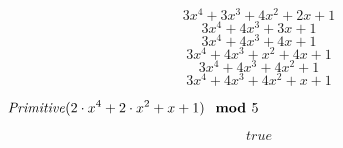 \documentclass{article}
\begin{document}
\vspace{-\bigskipamount}
\begin{dmath*}
3 x^{4}+3 x^{3}+4 x^{2}+2 x +1
\end{dmath*}
\vspace{-\bigskipamount}
\begin{dmath*}
3 x^{4}+4 x^{3}+3 x +1
\end{dmath*}
\vspace{-\bigskipamount}
\begin{dmath*}
3 x^{4}+4 x^{3}+4 x +1
\end{dmath*}
\vspace{-\bigskipamount}
\begin{dmath*}
3 x^{4}+4 x^{3}+x^{2}+4 x +1
\end{dmath*}
\vspace{-\bigskipamount}
\begin{dmath*}
3 x^{4}+4 x^{3}+4 x^{2}+1
\end{dmath*}
\vspace{-\bigskipamount}
\begin{dmath}\label{(10)}
3 x^{4}+4 x^{3}+4 x^{2}+x +1
\end{dmath}
\begin{Maple Normal}
{$ \displaystyle \mathit{Primitive} (2\cdot x^{4}+2\cdot x^{2}+x +1)\boldsymbol{\mod}5 $}
\end{Maple Normal}
\begin{dmath}\label{(11)}
\mathit{true} 
\end{dmath}
\begin{Maple Normal}

\end{Maple Normal}
\end{document}
